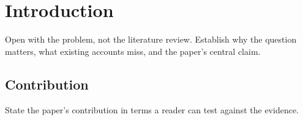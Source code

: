\section{Introduction}\label{sec:introduction}

Open with the problem, not the literature review. Establish why the question
matters, what existing accounts miss, and the paper's central claim.

\subsection{Contribution}

State the paper's contribution in terms a reader can test against the evidence.

